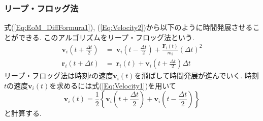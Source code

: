 \subsubsection{リープ・フロッグ法}
式(\ref{Eq:EoM_DiffFormura1}), (\ref{Eq:Velocity2})から以下のように時間発展させることができる.
このアルゴリズムをリープ・フロッグ法という.
\begin{align}
  \bm{v}_{i} \left(t + \frac{\Delta t}{2} \right)
 &=~
   \bm{v}_{i} \left(t - \frac{\Delta t}{2} \right)
 + \frac{\bm{F}_{i}(t)}{m_{i}} (\Delta t)^{2}
 \label{Eq:LeapFrog1}
 \\
 \bm{r}_{i} (t + \Delta t)
&=~
 \bm{r}_{i} (t) + \bm{v}_{i} \left( t + \frac{\Delta t}{2} \right) \Delta t
 \label{Eq:LeapFrog2}
\end{align}
リープ・フロッグ法は時刻$t$の速度$\bm{v}_{i}(t)$を飛ばして時間発展が進んでいく.
時刻$t$の速度$\bm{v}_{i}(t)$を求めるには式(\ref{Eq:Velocity1})を用いて
\begin{equation}
    \bm{v}_{i} (t) 
  = \frac{1}{2} 
    \left\{
           \bm{v}_{i} \left(t + \frac{\Delta t}{2}\right) 
         + \bm{v}_{i} \left(t - \frac{\Delta t}{2}\right)
    \right\}
    \label{Eq:LeapFrog3}
\end{equation}
と計算する.

